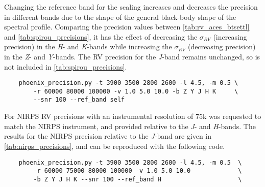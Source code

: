 Changing the reference band for the \snr{} scaling increases and decreases the precision in different bands due to the shape of the general black-body shape of the spectral profile.
Comparing the precision values between \cref{tab:rv_aces_btsettl} and \cref{tab:spirou_precisions}, it has the effect of decreasing the $\sigma_{RV}$ (increasing precision) in the \emph{H}- and \emph{K}-bands while increasing the $\sigma_{RV}$ (decreasing precision) in the \emph{Z}- and \emph{Y}-bands.
The {RV} precision for the \emph{J}-band remains unchanged, so is not included in \cref{tab:spirou_precisions}.

\begin{lstlisting}
    phoenix_precision.py -t 3900 3500 2800 2600 -l 4.5, -m 0.5 \
        -r 60000 80000 100000 -v 1.0 5.0 10.0 -b Z Y J H K     \
        --snr 100 --ref_band self
\end{lstlisting}


For {NIRPS} {RV} precisions with an instrumental resolution of 75k was requested to match the {NIRPS} instrument, and provided relative to the \emph{J}- and \emph{H}-bands.
The results for the {NIRPS} precision relative to the \emph{J}-band are given in \cref{tab:nirps_precisions}, and can be reproduced with the following code.

\begin{lstlisting}
    phoenix_precision.py -t 3900 3500 2800 2600 -l 4.5, -m 0.5  \
        -r 60000 75000 80000 100000 -v 1.0 5.0 10.0             \
        -b Z Y J H K --snr 100 --ref_band H                     \
\end{lstlisting}








